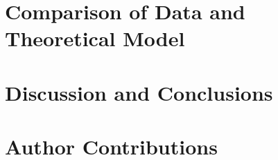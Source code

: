 \documentclass[aps,prl,twocolumn,groupedaddress]{revtex4-1}
\begin{document}
\section{Comparison of Data and Theoretical Model}
\section{Discussion and Conclusions}
\section{Author Contributions}


\end{document}
